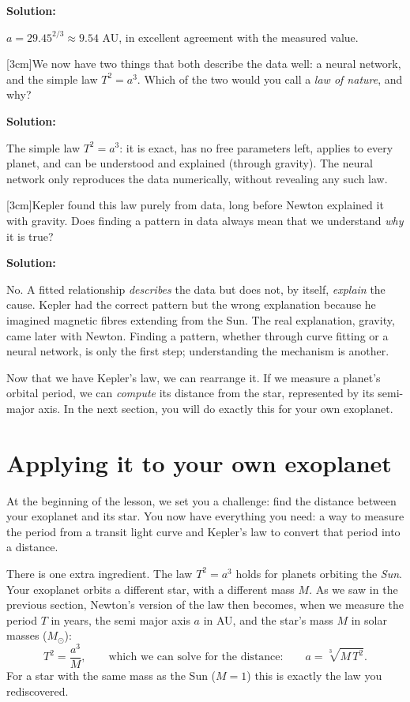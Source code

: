 \documentclass[12pt]{article}
\makeatletter
\newcounter{question}
\newlength\questionheight
\newcommand{\question}{\@ifstar{\question@text}{\question@field}}
\newcommand{\question@heading}[1]{%
  \refstepcounter{question}%
  \vspace{0.3cm}%
  \noindent\textbf{\faEdit\ Question \thequestion: #1}%
}
\newcommand{\question@text}[1]{%
  \question@heading{#1}%
}
\newcommand{\question@field}[2][\questionheight]{%
  \question@heading{#2}%
 \\[0.3em] \begin{Form}
    \TextField[
      name=Q\thequestion,
      multiline=true,
      width=\linewidth,
      height=#1,
      charsize=10pt,
      bordercolor={0 0 0},
      borderwidth=1.8,
      backgroundcolor={1 1 1}
    ]{}
  \end{Form}
  \vspace{0.3cm}%
}
\newenvironment{solution}{%
  \begin{solutionbox}\textbf{Solution:}
}{%
  \end{solutionbox}
}
\makeatother
\begin{document}
\begin{solution}
$a = 29.45^{2/3} \approx 9.54$ AU, in excellent agreement with the measured value.
\end{solution}

\question[3cm]{We now have two things that both describe the data well: a neural network, and the simple law $T^2 = a^3$. Which of the two would you call a \emph{law of nature}, and why?}

\begin{solution}
The simple law $T^2 = a^3$: it is exact, has no free parameters left, applies to every planet, and can be understood and explained (through gravity). The neural network only reproduces the data numerically, without revealing any such law.
\end{solution}

\question[3cm]{Kepler found this law purely from data, long before Newton explained it with gravity. Does finding a pattern in data always mean that we understand \emph{why} it is true?}

\begin{solution}
No. A fitted relationship \emph{describes} the data but does not, by itself, \emph{explain} the cause. Kepler had the correct pattern but the wrong explanation because he imagined magnetic fibres extending from the Sun. The real explanation, gravity, came later with Newton. Finding a pattern, whether through curve fitting or a neural network, is only the first step; understanding the mechanism is another.
\end{solution}

Now that we have Kepler's law, we can rearrange it. If we measure a planet's orbital period, we can \emph{compute} its distance from the star, represented by its semi-major axis. In the next section, you will do exactly this for your own exoplanet.



\section{Applying it to your own exoplanet}\label{sec:exoplanet}

At the beginning of the lesson, we set you a challenge: find the distance between your exoplanet and its star. You now have everything you need: a way to measure the period from a transit light curve and Kepler's law to convert that period into a distance.

There is one extra ingredient. The law $T^2 = a^3$ holds for planets orbiting the \emph{Sun}. Your exoplanet orbits a different star, with a different mass $M$. As we saw in the previous section, Newton's version of the law then becomes, when we measure the period $T$ in years, the semi major axis $a$ in AU, and the star's mass $M$ in solar masses ($M_\odot$):
$$T^2 = \frac{a^3}{M}, \qquad\text{which we can solve for the distance:}\qquad a = \sqrt[3]{M\,T^2}.$$
For a star with the same mass as the Sun ($M = 1$) this is exactly the law you rediscovered.
\end{document}
